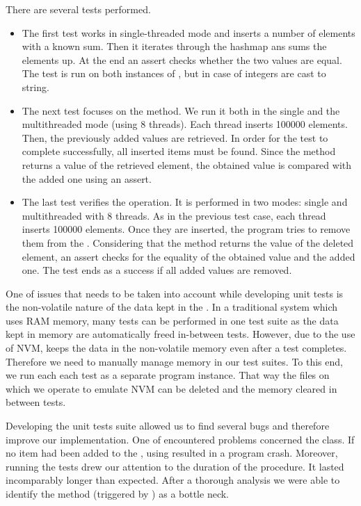     There are several tests performed.
    \begin{itemize}
    \item The first test works in single-threaded mode and inserts a number of elements with a known sum. 
        Then it iterates through the hashmap ans sums the elements up. 
        At the end an assert checks whether the two values are equal. 
        The test is run on both instances of \PHT, but in case of \NvmHashMap\stringsMap integers are cast to string.
    \item The next test focuses on the \getMethod method.
        We run it both in the single and the multithreaded mode (using 8 threads). 
        Each thread inserts 100000 elements. 
        Then, the previously added values are retrieved. 
        In order for the test to complete successfully, all inserted items must be found. 
        Since the \getMethod method returns a value of the retrieved element, the obtained value is compared with the added one using an assert.
    \item The last test verifies the \removeMethod operation. 
        It is performed in two modes: single and multithreaded with 8 threads. 
        As in the previous test case, each thread inserts 100000 elements. 
        Once they are inserted, the program tries to remove them from the \PHT. 
        Considering that the \removeMethod method returns the value of the deleted element, an assert checks for the equality of the obtained value and the added one. 
        The test ends as a success if all added values are removed.
    \end{itemize}

    One of issues that needs to be taken into account while developing unit tests is the non-volatile nature of the data kept in the \NvmHashMap. 
    In a traditional system which uses RAM memory, many tests can be performed in one test suite as the data kept in memory are automatically freed in-between tests. 
    However, due to the use of NVM, \PHT keeps the data in the non-volatile memory even after a test completes. 
    Therefore we need to manually manage memory in our test suites.
    To this end, we run each each test as a separate program instance. 
    That way the files on which we operate to emulate NVM can be deleted and the memory cleared in between tests.  

    Developing the unit tests suite allowed us to find several bugs and therefore improve our implementation. 
    One of encountered problems concerned the \Iterator class. 
    If no item had been added to the \PHT, using \Iterator resulted in a program crash.
    Moreover, running the tests drew our attention to the duration of the \insertMethod procedure. 
    It lasted incomparably longer than expected. 
    After a thorough analysis we were able to identify the \expandMethod method (triggered by \insertMethod) as a bottle neck.

